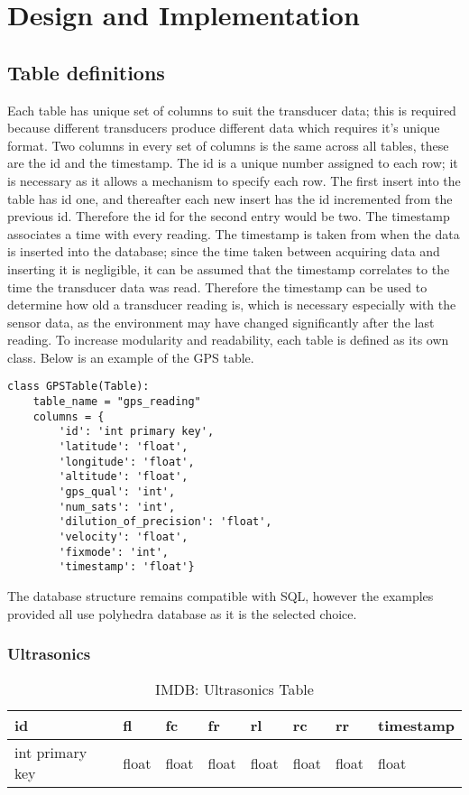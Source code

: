 \section{Design and Implementation}

\subsection{Table definitions}
Each table has unique set of columns to suit the transducer data; this is required because different transducers produce different data which requires it's unique format. Two columns in every set of columns is the same across all tables, these are the id and the timestamp. 
\newline
The id is a unique number assigned to each row; it is necessary as it allows a mechanism to specify each row. The first insert into the table has id one, and thereafter each new insert has the id incremented from the previous id. Therefore the id for the second entry would be two.
\newline
The timestamp associates a time with every reading. The timestamp is taken from when the data is inserted into the database; since the time taken between acquiring data and inserting it is negligible, it can be assumed that the timestamp correlates to the time the transducer data was read. Therefore the timestamp can be used to determine how old a transducer reading is, which is necessary especially with the sensor data, as the environment may have changed significantly after the last reading.
\newline
To increase modularity and readability, each table is defined as its own class. Below is an example of the GPS table. 
\begin{lstlisting}[style=custompython]
class GPSTable(Table):
    table_name = "gps_reading"
    columns = {
        'id': 'int primary key',
        'latitude': 'float',
        'longitude': 'float',
        'altitude': 'float',
        'gps_qual': 'int',
        'num_sats': 'int',
        'dilution_of_precision': 'float',
        'velocity': 'float',
        'fixmode': 'int',
        'timestamp': 'float'}
\end{lstlisting}

The database structure remains compatible with SQL, however the examples provided all use polyhedra database as it is the selected choice.

\subsubsection{Ultrasonics}
\begin{table}[!htb]
\centering
\begin{tabular}{|l|l|l|l|l|l|l|l|}
\hline
id              & fl    & fc    & fr    & rl    & rc    & rr    & timestamp \\ \hline
int primary key & float & float & float & float & float & float & float \\ \hline
\end{tabular}
\caption{IMDB: Ultrasonics Table}
\label{tab:db-ultrasonics}
\end{table}


